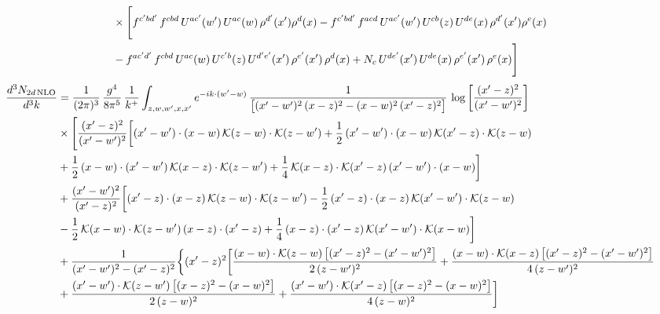 \documentclass[9pt]{article}
\numberwithin{equation}{section}
\begin{document}
\begin{align}
&\times\Bigg[f^{c^{\prime}bd^{\prime}}\,f^{cbd}\, U^{ac^{\prime}}(w^{\prime})\,U^{ac}(w)\,\rho^{d^{\prime}}(x^{\prime})\rho^{d}(x)- f^{c^{\prime}bd^{\prime}}\,f^{acd}\,U^{ac^{\prime}}(w^{\prime})\,U^{cb}(z)\,U^{de}(x)\,\rho^{d^{\prime}}(x^{\prime})\rho^{e}(x) \notag \\ & -f^{ac^{\prime}d^{\prime}}\,f^{cbd}\,U^{ac}(w)\,U^{c^{\prime}b}(z)\,U^{d^{\prime}e^{\prime}}(x^{\prime})\,\rho^{e^{\prime}}(x^{\prime})\,\rho^{d}(x) +N_{c}\,U^{de^{\prime}}(x^{\prime})\,U^{de}(x)\,\rho^{e^{\prime}}(x^{\prime})\,\rho^{e}(x)\Bigg]
\end{align}
\begin{align}
\frac{d^{3}N_{2d\,\rm NLO}}{d^{3}k}&= \frac{1}{(2\pi)^{3}}\,\frac{g^{4}}{8\pi^{5}}\,\frac{1}{k^{+}}\int_{z,w,w^{\prime},x,x^{\prime}}e^{-ik\cdot(w^{\prime}-w)}\,\frac{1}{\big[(x^{\prime}-w^{\prime})^{2}\,(x-z)^{2}-(x-w)^{2}\,(x^{\prime}-z)^{2}\big]}\,\log\left[\frac{(x^{\prime}-z)^{2}}{(x^{\prime}-w^{\prime})^{2}}\right]\notag\\
&\times\Bigg[\frac{(x^{\prime}-z)^{2}}{(x^{\prime}-w^{\prime})^{2}}\bigg[(x^{\prime}-w^{\prime})\cdot(x-w)\,\mathcal{K}(z-w)\cdot\mathcal{K}(z-w^{\prime})+\frac{1}{2}\,(x^{\prime}-w^{\prime})\cdot(x-w)\,\mathcal{K}(x^{\prime}-z)\cdot\mathcal{K}(z-w)\notag \\ & +\frac{1}{2}\,(x-w)\cdot(x^{\prime}-w^{\prime})\,\mathcal{K}(x-z)\cdot\mathcal{K}(z-w^{\prime})+\frac{1}{4}\,\mathcal{K}(x-z)\cdot\mathcal{K}(x^{\prime}-z)\,(x^{\prime}-w^{\prime})\cdot(x-w)\bigg]\notag\\
&+\frac{(x^{\prime}-w^{\prime})^{2}}{(x^{\prime}-z)^{2}}\bigg[(x^{\prime}-z)\cdot(x-z)\,\mathcal{K}(z-w)\cdot\mathcal{K}(z-w^{\prime})-\frac{1}{2}\,(x^{\prime}-z)\cdot(x-z)\,\mathcal{K}(x^{\prime}-w^{\prime})\cdot\mathcal{K}(z-w)\notag \\ & -\frac{1}{2}\,\mathcal{K}(x-w)\cdot\mathcal{K}(z-w^{\prime})\,(x-z)\cdot(x^{\prime}-z)+\frac{1}{4}\,(x-z)\cdot(x^{\prime}-z)\,\mathcal{K}(x^{\prime}-w^{\prime})\cdot\mathcal{K}(x-w)\bigg]\notag\\
&+\frac{1}{(x^{\prime}-w^{\prime})^{2}-(x^{\prime}-z)^{2}}\bigg\{(x^{\prime}-z)^{2}\bigg[\frac{(x-w)\cdot\mathcal{K}(z-w)\,\big[(x^{\prime}-z)^{2}-(x^{\prime}-w^{\prime})^{2}\big]}{2\,(z-w^{\prime})^{2}}+\frac{(x-w)\cdot\mathcal{K}(x-z)\,\big[(x^{\prime}-z)^{2}-(x^{\prime}-w^{\prime})^{2}\big]}{4\,(z-w^{\prime})^{2}}\notag \\ & +\frac{(x^{\prime}-w^{\prime})\cdot\mathcal{K}(z-w^{\prime})\,\big[(x-z)^{2}-(x-w)^{2}\big]}{2\,(z-w)^{2}}+\frac{(x^{\prime}-w^{\prime})\cdot\mathcal{K}(x^{\prime}-z)\,\big[(x-z)^{2}-(x-w)^{2}\big]}{4\,(z-w)^{2}}\bigg]\notag\\

\end{align}
\end{document}
